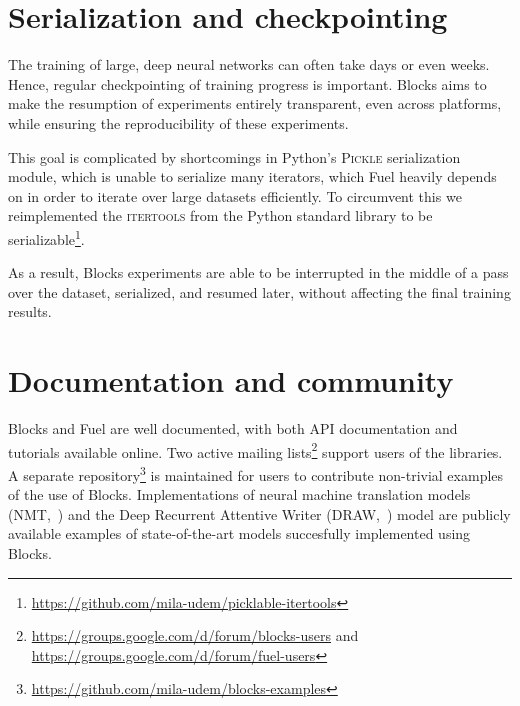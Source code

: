 \documentclass[twoside,11pt]{article}
\begin{document}
\section{Serialization and checkpointing}

The training of large, deep neural networks can often take days or even weeks.
Hence, regular checkpointing of training progress is important. Blocks aims to
make the resumption of experiments entirely transparent, even across platforms,
while ensuring the reproducibility of these experiments.

This goal is complicated by shortcomings in Python's \textsc{Pickle}
serialization module, which is unable to serialize many iterators, which Fuel
heavily depends on in order to iterate over large datasets efficiently. To
circumvent this we reimplemented the \textsc{itertools} from the Python
standard library to be
serializable\footnote{\url{https://github.com/mila-udem/picklable-itertools}}.

As a result, Blocks experiments are able to be interrupted in the middle of a
pass over the dataset, serialized, and resumed later, without affecting the
final training results.

\section{Documentation and community}

Blocks and Fuel are well documented, with both API documentation and tutorials
available online. Two active mailing
lists\footnote{\url{https://groups.google.com/d/forum/blocks-users} and
\url{https://groups.google.com/d/forum/fuel-users}} support users of the
libraries. A separate
repository\footnote{\url{https://github.com/mila-udem/blocks-examples}} is
maintained for users to contribute non-trivial examples of the use of Blocks.
Implementations of neural machine translation models
(NMT,~\cite{bahdanau2015neural}) and the Deep Recurrent Attentive Writer
(DRAW,~\cite{gregor2015draw}) model are publicly available examples of
state-of-the-art models succesfully implemented using Blocks.



\end{document}
